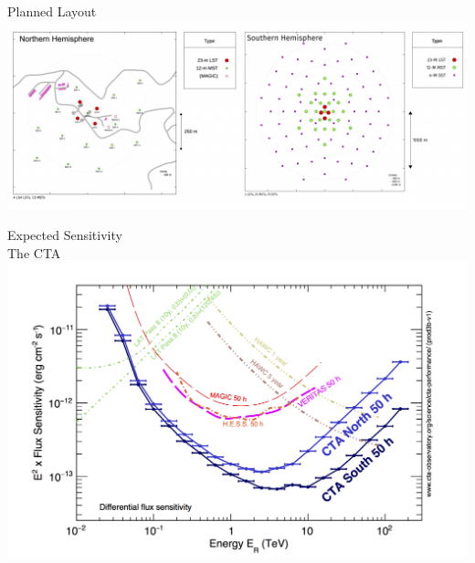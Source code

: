 \begin{frame}{Planned Layout \\ \footnotesize{\cite{cta_sensitivity}}}
\centering
        \includegraphics[width=\linewidth]{images/cta_layout.png}
\end{frame}


\begin{frame}{Expected Sensitivity \\ \footnotesize{The CTA \cite{cta_sensitivity}}}
\centering
        \includegraphics[width=0.7\linewidth]{images/cta_sensitivity.png}
\end{frame}

